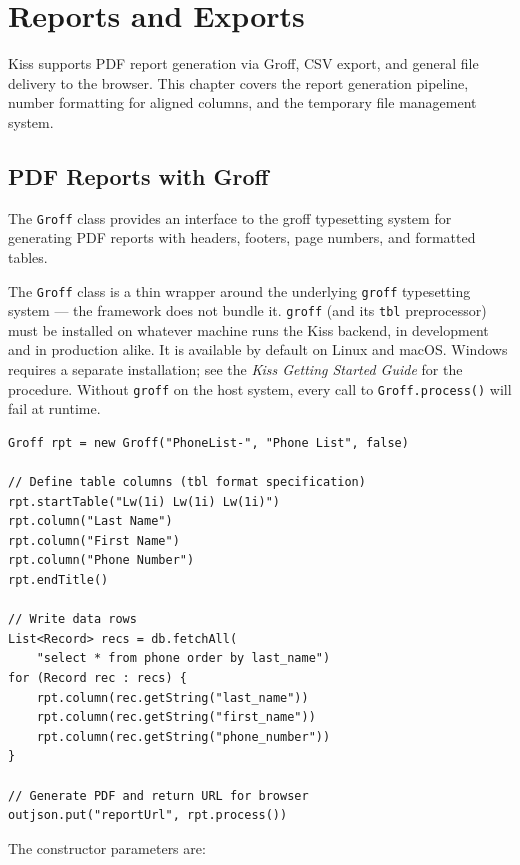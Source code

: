 \chapter{Reports and Exports}
\label{ch:reports}

Kiss supports PDF report generation via Groff, CSV export, and general file delivery to the browser.  This chapter covers the report generation pipeline, number formatting for aligned columns, and the temporary file management system.

\section{PDF Reports with Groff}
\label{sec:rpt-groff}

The \texttt{Groff} class provides an interface to the groff typesetting system for generating PDF reports with headers, footers, page numbers, and formatted tables.

\begin{warnbox}
The \texttt{Groff} class is a thin wrapper around the underlying \texttt{groff} typesetting system --- the framework does not bundle it.  \texttt{groff} (and its \texttt{tbl} preprocessor) must be installed on whatever machine runs the Kiss backend, in development and in production alike.  It is available by default on Linux and macOS.  Windows requires a separate installation; see the \emph{Kiss Getting Started Guide} for the procedure.  Without \texttt{groff} on the host system, every call to \texttt{Groff.process()} will fail at runtime.
\end{warnbox}

\begin{lstlisting}[style=groovy]
Groff rpt = new Groff("PhoneList-", "Phone List", false)

// Define table columns (tbl format specification)
rpt.startTable("Lw(1i) Lw(1i) Lw(1i)")
rpt.column("Last Name")
rpt.column("First Name")
rpt.column("Phone Number")
rpt.endTitle()

// Write data rows
List<Record> recs = db.fetchAll(
    "select * from phone order by last_name")
for (Record rec : recs) {
    rpt.column(rec.getString("last_name"))
    rpt.column(rec.getString("first_name"))
    rpt.column(rec.getString("phone_number"))
}

// Generate PDF and return URL for browser
outjson.put("reportUrl", rpt.process())
\end{lstlisting}

\noindent
The constructor parameters are:

